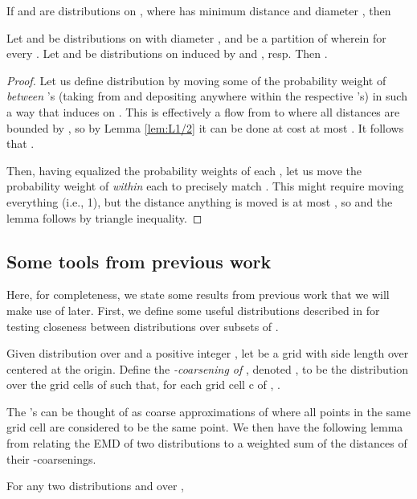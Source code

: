 \documentclass[11pt]{article}
\begin{document}
\begin{corollary}\label{cor:EMDvsL1}
        If  and  are distributions on , where  has minimum
        distance  and diameter , then
        
\end{corollary}

\begin{lemma}\label{lem:buckets}
        Let  and  be distributions on  with diameter , and
         be a partition of  wherein  for
        every . Let  and  be distributions on 
        induced by  and , resp. Then .
\end{lemma}

\begin{proof}
        Let us define distribution  by moving some of the probability weight of 
        {\em between} 's (taking from and depositing anywhere within the respective
        's) in such a way that  induces  on . This is effectively a flow
        from  to  where all distances are bounded by , so by Lemma
        \ref{lem:L1/2} it can be done at cost at most .
        It follows that .
        
        Then, having equalized the probability weights of each , let us move the
        probability weight of  {\em within} each  to precisely match . This
        might require moving everything (i.e., 1), but the distance anything is moved is
        at most , so  and the lemma follows by triangle
        inequality.
\end{proof}

\subsection{Some tools from previous work}

Here, for completeness, we state some results from previous work that we will make use
of later. First, we define some useful distributions described in \cite{indyk}
for testing closeness between distributions over subsets of .

\begin{definition}
Given distribution  over  and a positive integer , let  be a grid with side length  over  centered at the origin. Define the {\em -coarsening of }, denoted , to be the distribution over the grid cells of  such that, for each grid cell c of , .
\end{definition}

The 's can be thought of as coarse approximations of 
where all points in the same grid cell are considered to be the same point.
We then have the following lemma from \cite{indyk} relating the EMD of two distributions
to a weighted sum of the  distances of their -coarsenings.
\begin{lemma}
\label{lemma:bindiv}
For any two distributions  and  over ,

\end{lemma}
\end{document}
